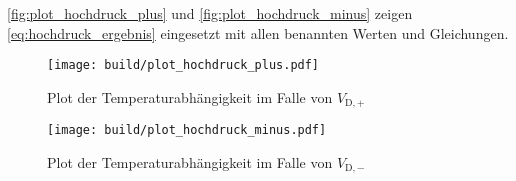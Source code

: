 \autoref{fig:plot_hochdruck_plus} und \autoref{fig:plot_hochdruck_minus} zeigen \autoref{eq:hochdruck_ergebnis} eingesetzt mit allen benannten Werten und Gleichungen.

\begin{figure}
    \centering
    \texttt{[image: build/plot\_hochdruck\_plus.pdf]}
    \caption{Plot der Temperaturabhängigkeit im Falle von $V_{\text{D},+}$}
    \label{fig:plot_hochdruck_plus}
\end{figure}

\begin{figure}
    \centering
    \texttt{[image: build/plot\_hochdruck\_minus.pdf]}
    \caption{Plot der Temperaturabhängigkeit im Falle von $V_{\text{D},-}$}
    \label{fig:plot_hochdruck_minus}
\end{figure}